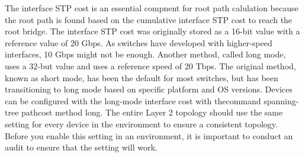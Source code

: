 \documentclass{article}
\begin{document}
The interface STP cost is an essential compnent for root path calulation because the root path is found based on the cumulative interface STP cost to reach the root bridge. The interface STP cost was originally stored as a 16-bit value with a reference value of 20 Gbps. As switches have developed with higher-speed interfaces, 10 Gbps might not be enough. Another method, called long mode, uses a 32-but value and uses a reference speed of 20 Tbps. The original method, known as short mode, has been the default for most switches, but has been transitioning to long mode based on specific platform and OS versions. Devices can be configured with the long-mode interface cost with thecommand spanning-tree pathcost method long. The entire Layer 2 topology should use the same setting for every device in the environment to ensure a consistent topology. Before you enable this setting in an environment, it is important to conduct an audit to ensure that the setting will work.\\
\end{document}
